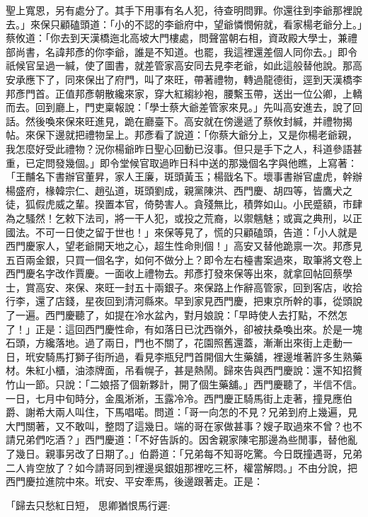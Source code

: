 \begin{showcontents}{}
聖上寬恩，另有處分了。其手下用事有名人犯，待查明問罪。你還往到李爺那裡說去。」來保只顧磕頭道：「小的不認的李爺府中，望爺憐憫俯就，看家楊老爺分上。」蔡攸道：「你去到天漢橋迤北高坡大門樓處，問聲當朝右相，資政殿大學士，兼禮部尚書，名諱邦彥的你李爺，誰是不知道。也罷，我這裡還差個人同你去。」即令祇候官呈過一緘，使了圖書，就差管家高安同去見李老爺，如此這般替他說。那高安承應下了，同來保出了府門，叫了來旺，帶著禮物，轉過龍德街，逕到天漢橋李邦彥門首。正值邦彥朝散纔來家，穿大紅縐紗袍，腰繫玉帶，送出一位公卿，上轎而去。回到廳上，門吏稟報說：「學士蔡大爺差管家來見。」先叫高安進去，說了回話。然後喚來保來旺進見，跪在廳臺下。高安就在傍邊遞了蔡攸封緘，并禮物揭帖。來保下邊就把禮物呈上。邦彥看了說道：「你蔡大爺分上，又是你楊老爺親，我怎麼好受此禮物？況你楊爺昨日聖心回動已沒事。但只是手下之人，科道參語甚重，已定問發幾個。」即令堂候官取過昨日科中送的那幾個名字與他瞧，上寫著：「王黼名下書辦官董昇，家人王廉，斑頭黃玉；楊戩名下。壞事書辦官盧虎，幹辦楊盛府，椽韓宗仁、趙弘道，斑頭劉成，親黨陳洪、西門慶、胡四等，皆鷹犬之徒，狐假虎威之輩。揆置本官，倚勢害人。貪殘無比，積弊如山。小民蹙額，巿肆為之騷然！乞敕下法司，將一干人犯，或投之荒裔，以禦魑魅；或寘之典刑，以正國法。不可一日使之留于世也！」來保等見了，慌的只顧磕頭，告道：「小人就是西門慶家人，望老爺開天地之心，超生性命則個！」高安又替他跪禀一次。邦彥見五百兩金銀，只買一個名字，如何不做分上？即令左右檯書案過來，取筆將文卷上西門慶名字改作賈慶。一面收上禮物去。邦彥打發來保等出來，就拿回帖回蔡學士，賞高安、來保、來旺一封五十兩銀子。來保路上作辭高管家，回到客店，收拾行李，還了店錢，星夜回到清河縣來。早到家見西門慶，把東京所幹的事，從頭說了一遍。西門慶聽了，如提在冷水盆內，對月娘說：「早時使人去打點，不然怎了！」正是：這回西門慶性命，有如落日已沈西嶺外，卻被扶桑喚出來。於是一塊石頭，方纔落地。過了兩日，門也不關了，花園照舊還蓋，漸漸出來街上走動一日，玳安騎馬打獅子街所過，看見李瓶兒門首開個大生藥舖，裡邊堆著許多生熟藥材。朱紅小櫃，油漆牌面，吊看幌子，甚是熱鬧。歸來告與西門慶說：還不知招贅竹山一節。只說：「二娘搭了個新夥計，開了個生藥舖。」西門慶聽了，半信不信。一日，七月中旬時分，金風淅淅，玉露冷冷。西門慶正騎馬街上走著，撞見應伯爵、謝希大兩人叫住，下馬唱喏。問道：「哥一向怎的不見？兄弟到府上幾遍，見大門關著，又不敢叫，整悶了這幾日。端的哥在家做甚事？嫂子取過來不曾？也不請兄弟們吃酒？」西門慶道：「不好告訴的。因舍親家陳宅那邊為些閒事，替他亂了幾日。親事另改了日期了。」伯爵道：「兄弟每不知哥吃驚。今日既撞遇哥，兄弟二人肯空放了？如今請哥同到裡邊吳銀姐那裡吃三杯，權當解悶。」不由分說，把西門慶拉進院中來。玳安、平安牽馬，後邊跟著走。正是：

「歸去只愁紅日短，  思卿猶恨馬行遲:


\end{showcontents}
